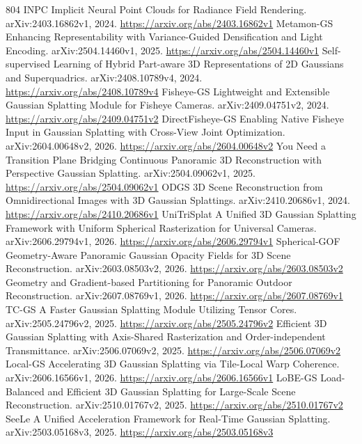 \documentclass[11pt]{article}
\begin{document}
\begin{thebibliography}{804}
 INPC Implicit Neural Point Clouds for Radiance Field Rendering. arXiv:2403.16862v1, 2024. \url{https://arxiv.org/abs/2403.16862v1}
 Metamon-GS Enhancing Representability with Variance-Guided Densification and Light Encoding. arXiv:2504.14460v1, 2025. \url{https://arxiv.org/abs/2504.14460v1}
 Self-supervised Learning of Hybrid Part-aware 3D Representations of 2D Gaussians and Superquadrics. arXiv:2408.10789v4, 2024. \url{https://arxiv.org/abs/2408.10789v4}
 Fisheye-GS Lightweight and Extensible Gaussian Splatting Module for Fisheye Cameras. arXiv:2409.04751v2, 2024. \url{https://arxiv.org/abs/2409.04751v2}
 DirectFisheye-GS Enabling Native Fisheye Input in Gaussian Splatting with Cross-View Joint Optimization. arXiv:2604.00648v2, 2026. \url{https://arxiv.org/abs/2604.00648v2}
 You Need a Transition Plane Bridging Continuous Panoramic 3D Reconstruction with Perspective Gaussian Splatting. arXiv:2504.09062v1, 2025. \url{https://arxiv.org/abs/2504.09062v1}
 ODGS 3D Scene Reconstruction from Omnidirectional Images with 3D Gaussian Splattings. arXiv:2410.20686v1, 2024. \url{https://arxiv.org/abs/2410.20686v1}
 UniTriSplat A Unified 3D Gaussian Splatting Framework with Uniform Spherical Rasterization for Universal Cameras. arXiv:2606.29794v1, 2026. \url{https://arxiv.org/abs/2606.29794v1}
 Spherical-GOF Geometry-Aware Panoramic Gaussian Opacity Fields for 3D Scene Reconstruction. arXiv:2603.08503v2, 2026. \url{https://arxiv.org/abs/2603.08503v2}
 Geometry and Gradient-based Partitioning for Panoramic Outdoor Reconstruction. arXiv:2607.08769v1, 2026. \url{https://arxiv.org/abs/2607.08769v1}
 TC-GS A Faster Gaussian Splatting Module Utilizing Tensor Cores. arXiv:2505.24796v2, 2025. \url{https://arxiv.org/abs/2505.24796v2}
 Efficient 3D Gaussian Splatting with Axis-Shared Rasterization and Order-independent Transmittance. arXiv:2506.07069v2, 2025. \url{https://arxiv.org/abs/2506.07069v2}
 Local-GS Accelerating 3D Gaussian Splatting via Tile-Local Warp Coherence. arXiv:2606.16566v1, 2026. \url{https://arxiv.org/abs/2606.16566v1}
 LoBE-GS Load-Balanced and Efficient 3D Gaussian Splatting for Large-Scale Scene Reconstruction. arXiv:2510.01767v2, 2025. \url{https://arxiv.org/abs/2510.01767v2}
 SeeLe A Unified Acceleration Framework for Real-Time Gaussian Splatting. arXiv:2503.05168v3, 2025. \url{https://arxiv.org/abs/2503.05168v3}

\end{thebibliography}
\end{document}
